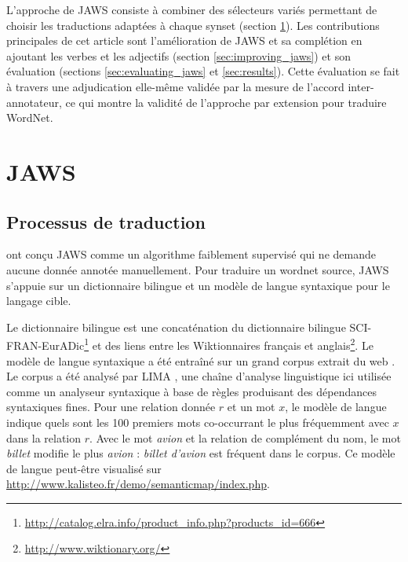 L'approche de JAWS consiste à combiner des sélecteurs variés permettant de choisir les traductions adaptées à chaque synset (section \ref{sec:jaws}). Les contributions principales de cet article sont l'amélioration de JAWS et sa complétion en ajoutant les verbes et les adjectifs (section \ref{sec:improving_jaws}) et son évaluation (sections \ref{sec:evaluating_jaws} et \ref{sec:results}). Cette évaluation se fait à travers une adjudication elle-même validée par la mesure de l'accord inter-annotateur, ce qui montre la validité de l'approche par extension pour traduire WordNet.

\section{JAWS}
\label{sec:jaws}

\subsection{Processus de traduction}
\label{subsec:translation_process}

\cite{mouton2010jaws} ont conçu JAWS comme un algorithme faiblement supervisé qui ne demande aucune donnée annotée manuellement. Pour traduire un wordnet source, JAWS s'appuie sur un dictionnaire bilingue et un modèle de langue syntaxique pour le langage cible.

Le dictionnaire bilingue est une concaténation du dictionnaire bilingue
SCI-FRAN-EurADic\footnote{\url{http://catalog.elra.info/product_info.php?products_id=666}}
et des liens entre les Wiktionnaires français et
anglais\footnote{\url{http://www.wiktionary.org/}}. Le modèle de langue
syntaxique a été entraîné sur un grand corpus extrait du web
\citep{grefenstette2007conquering}. Le corpus a été analysé par LIMA
\citep{besancon2010lima}, une chaîne d'analyse linguistique ici utilisée comme
un analyseur syntaxique à base de règles produisant des dépendances syntaxiques
fines. Pour une relation donnée $r$ et un mot $x$, le modèle de langue indique
quels sont les 100 premiers mots co-occurrant le plus fréquemment avec $x$ dans
la relation $r$. Avec le mot \textit{avion} et la relation de complément du
nom, le mot \textit{billet} modifie le plus \textit{avion} : \textit{billet
d'avion} est fréquent dans le corpus. Ce modèle de langue peut-être visualisé
sur \url{http://www.kalisteo.fr/demo/semanticmap/index.php}.

